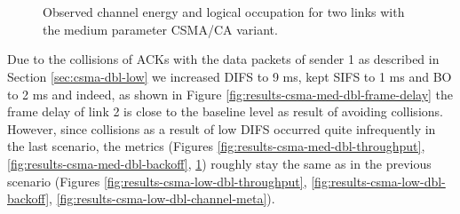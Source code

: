 \begin{figure}[tb]
	\label{fig:results-csma-med-dbl-channel-meta}
	\begin{center}
		\\
		\\
	\end{center}
	\caption{Observed channel energy and logical occupation for two links with the medium parameter CSMA/CA variant.}
\end{figure}

Due to the collisions of ACKs with the data packets of sender 1 as described in Section \ref{sec:csma-dbl-low} we increased DIFS to 9 ms, kept SIFS to 1 ms and BO to 2 ms and indeed, as shown in Figure \ref{fig:results-csma-med-dbl-frame-delay} the frame delay of link 2 is close to the baseline level as result of avoiding collisions. However, since collisions as a result of low DIFS occurred quite infrequently in the last scenario, the metrics (Figures \ref{fig:results-csma-med-dbl-throughput}, \ref{fig:results-csma-med-dbl-backoff}, \ref{fig:results-csma-med-dbl-channel-meta}) roughly stay the same as in the previous scenario (Figures \ref{fig:results-csma-low-dbl-throughput}, \ref{fig:results-csma-low-dbl-backoff}, \ref{fig:results-csma-low-dbl-channel-meta}).

